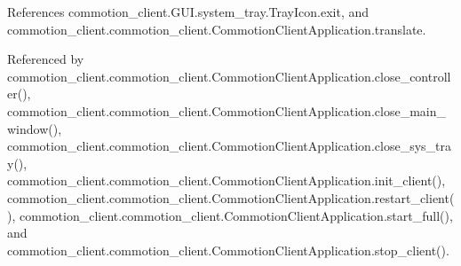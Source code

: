 References commotion\+\_\+client.\+G\+U\+I.\+system\+\_\+tray.\+Tray\+Icon.\+exit, and commotion\+\_\+client.\+commotion\+\_\+client.\+Commotion\+Client\+Application.\+translate.



Referenced by commotion\+\_\+client.\+commotion\+\_\+client.\+Commotion\+Client\+Application.\+close\+\_\+controller(), commotion\+\_\+client.\+commotion\+\_\+client.\+Commotion\+Client\+Application.\+close\+\_\+main\+\_\+window(), commotion\+\_\+client.\+commotion\+\_\+client.\+Commotion\+Client\+Application.\+close\+\_\+sys\+\_\+tray(), commotion\+\_\+client.\+commotion\+\_\+client.\+Commotion\+Client\+Application.\+init\+\_\+client(), commotion\+\_\+client.\+commotion\+\_\+client.\+Commotion\+Client\+Application.\+restart\+\_\+client(), commotion\+\_\+client.\+commotion\+\_\+client.\+Commotion\+Client\+Application.\+start\+\_\+full(), and commotion\+\_\+client.\+commotion\+\_\+client.\+Commotion\+Client\+Application.\+stop\+\_\+client().


